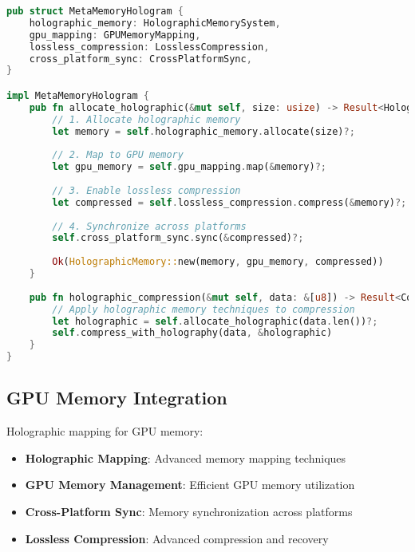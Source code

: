 \documentclass[12pt,a4paper]{article}
\begin{document}
\begin{lstlisting}[language=Rust, caption=MMH Implementation]
pub struct MetaMemoryHologram {
    holographic_memory: HolographicMemorySystem,
    gpu_mapping: GPUMemoryMapping,
    lossless_compression: LosslessCompression,
    cross_platform_sync: CrossPlatformSync,
}

impl MetaMemoryHologram {
    pub fn allocate_holographic(&mut self, size: usize) -> Result<HolographicMemory> {
        // 1. Allocate holographic memory
        let memory = self.holographic_memory.allocate(size)?;
        
        // 2. Map to GPU memory
        let gpu_memory = self.gpu_mapping.map(&memory)?;
        
        // 3. Enable lossless compression
        let compressed = self.lossless_compression.compress(&memory)?;
        
        // 4. Synchronize across platforms
        self.cross_platform_sync.sync(&compressed)?;
        
        Ok(HolographicMemory::new(memory, gpu_memory, compressed))
    }
    
    pub fn holographic_compression(&mut self, data: &[u8]) -> Result<CompressedData> {
        // Apply holographic memory techniques to compression
        let holographic = self.allocate_holographic(data.len())?;
        self.compress_with_holography(data, &holographic)
    }
}
\end{lstlisting}

\subsection{GPU Memory Integration}
Holographic mapping for GPU memory:

\begin{itemize}
    \item \textbf{Holographic Mapping}: Advanced memory mapping techniques
    \item \textbf{GPU Memory Management}: Efficient GPU memory utilization
    \item \textbf{Cross-Platform Sync}: Memory synchronization across platforms
    \item \textbf{Lossless Compression}: Advanced compression and recovery
\end{itemize}
\end{document}
